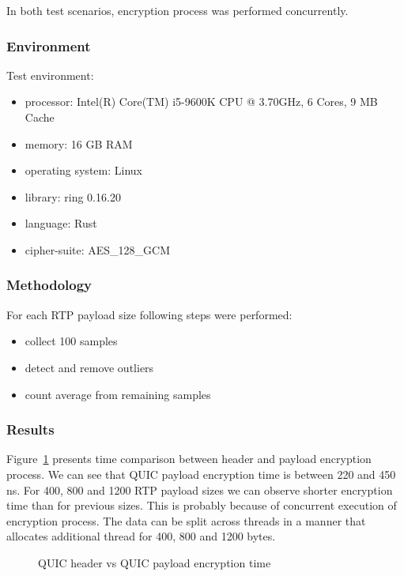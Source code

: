 In both test scenarios, encryption process was performed concurrently.

\subsubsection{Environment}
Test environment:
\begin{itemize}
    \item processor: Intel(R) Core(TM) i5-9600K CPU @ 3.70GHz, 6 Cores, 9 MB Cache
    \item memory: 16 GB RAM
    \item operating system: Linux
    \item library: ring 0.16.20
    \item language: Rust
    \item cipher-suite: AES\_128\_GCM
\end{itemize}

\subsubsection{Methodology}
For each RTP payload size following steps were performed:
\begin{itemize}
    \item collect 100 samples
    \item detect and remove outliers
    \item count average from remaining samples
\end{itemize}

\subsubsection{Results}
Figure~\ref{fig:header-payload-enc} presents time comparison between header and payload encryption process.
We can see that QUIC payload encryption time is between 220 and 450 ns.
For 400, 800 and 1200 RTP payload sizes we can observe shorter encryption time than for previous sizes.
This is probably because of concurrent execution of encryption process.
The data can be split across threads in a manner that allocates additional thread for 400, 800 and 1200 bytes.

\begin{figure}[h]
    \centering
    \caption{QUIC header vs QUIC payload encryption time}
    \label{fig:header-payload-enc}
\end{figure}


